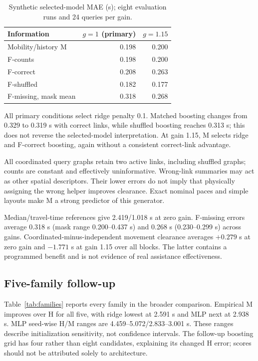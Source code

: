 \documentclass[conference]{IEEEtran}
\begin{document}
\begin{table}[t]\caption{Synthetic selected-model MAE (s); eight evaluation runs and 24 queries per gain.}\label{tab:links}\centering
\begin{tabular}{lrr}\toprule Information&$g=1$ (primary)&$g=1.15$\\\midrule
Mobility/history M&0.198&0.200\\
F-counts&0.198&0.200\\
F-correct&0.208&0.263\\
F-shuffled&0.182&0.177\\
F-missing, mask mean&0.318&0.268\\\bottomrule\end{tabular}\end{table}

All primary conditions select ridge penalty 0.1. Matched boosting changes from 0.329 to 0.319 s with correct links, while shuffled boosting reaches 0.313 s; this does not reverse the selected-model interpretation. At gain 1.15, M selects ridge and F-correct boosting, again without a consistent correct-link advantage.

All coordinated query graphs retain two active links, including shuffled graphs; counts are constant and effectively uninformative. Wrong-link summaries may act as other spatial descriptors. Their lower errors do not imply that physically assigning the wrong helper improves clearance. Exact nominal paces and simple layouts make M a strong predictor of this generator.

Median/travel-time references give 2.419/1.018 s at zero gain. F-missing errors average 0.318 s (mask range 0.200--0.437 s) and 0.268 s (0.230--0.299 s) across gains. Coordinated-minus-independent movement clearance averages $+0.279$ s at zero gain and $-1.771$ s at gain 1.15 over all blocks. The latter contains a programmed benefit and is not evidence of real assistance effectiveness.

\subsection{Five-family follow-up}
Table~\ref{tab:families} reports every family in the broader comparison. Empirical M improves over H for all five, with ridge lowest at 2.591 s and MLP next at 2.938 s. MLP seed-wise H/M ranges are 4.459--5.072/2.833--3.001 s. These ranges describe initialization sensitivity, not confidence intervals. The follow-up boosting grid has four rather than eight candidates, explaining its changed H error; scores should not be attributed solely to architecture.
\end{document}
